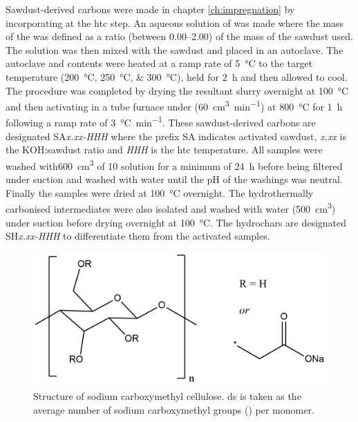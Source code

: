 Sawdust-derived carbons were made in chapter \ref{ch:impregnation} by incorporating  at the \gls{htc} step. An aqueous solution of  was made where the mass of the  was defined as a ratio (between \numrange{0.00}{2.00}) of the mass of the sawdust used. The solution was then mixed with the sawdust and placed in an autoclave. The autoclave and contents were heated at a ramp rate of \qty{5}{\degreeCelsius} to the target temperature (\qtylist[list-units=single, list-final-separator={ or }]{200;250;300}{\degreeCelsius}), held for \qty{2}{\hour} and then allowed to cool. The procedure was completed by drying the resultant slurry overnight at \qty{100}{\degreeCelsius} and then activating in a tube furnace under  (\qty{60}{\cm\cubed\per\minute}) at \qty{800}{\degreeCelsius} for \qty{1}{\hour} following a ramp rate of \qty{3}{\degreeCelsius\per\minute}. These sawdust-derived carbons are designated SA\textit{x.xx-HHH} where the prefix SA indicates activated sawdust, \textit{x.xx} is the KOH:sawdust ratio and \textit{HHH} is the \gls{htc} temperature. All samples were washed with\qty{600}{\cm\cubed} of \qty{10}{\volpercent}  solution for a minimum of \qty{24}{\hour} before being filtered under suction and washed with water until the pH of the washings was neutral. Finally the samples were dried at \qty{100}{\degreeCelsius} overnight. The hydrothermally carbonised intermediates were also isolated and washed with water (\qty{500}{\cm\cubed}) under suction before drying overnight at \qty{100}{\degreeCelsius}. The hydrochars are designated  SH\textit{x.xx-HHH} to differentiate them from the activated samples.

\begin{figure}[ht!]
    \centering
    \includegraphics[width=0.8\columnwidth]{4-impregnation/figs/nc_structure.png}
    \caption{Structure of sodium carboxymethyl cellulose. \Acrfull{ds} is taken as the average number of sodium carboxymethyl groups () per monomer.}
    \label{fig:nc_structure}
\end{figure}

